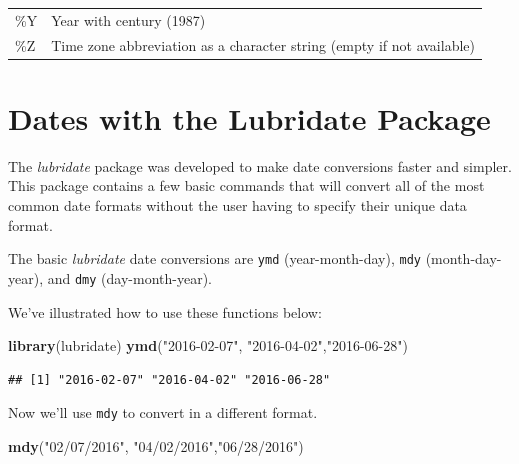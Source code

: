 \documentclass[]{book}
\newenvironment{Shaded}{\begin{snugshade}}{\end{snugshade}}
\newcommand{\KeywordTok}[1]{\textcolor[rgb]{0.13,0.29,0.53}{\textbf{{#1}}}}
\newcommand{\StringTok}[1]{\textcolor[rgb]{0.31,0.60,0.02}{{#1}}}
\newcommand{\NormalTok}[1]{{#1}}
\begin{document}
\begin{longtable}[]{@{}ll@{}}
\begin{minipage}[t]{0.34\columnwidth}\raggedright\strut
\%Y\strut
\end{minipage} & \begin{minipage}[t]{0.48\columnwidth}\raggedright\strut
Year with century (1987)\strut
\end{minipage}\tabularnewline
\begin{minipage}[t]{0.34\columnwidth}\raggedright\strut
\%Z\strut
\end{minipage} & \begin{minipage}[t]{0.48\columnwidth}\raggedright\strut
Time zone abbreviation as a character string (empty if not
available)\strut
\end{minipage}\tabularnewline
\bottomrule
\end{longtable}

\section{Dates with the Lubridate
Package}\label{dates-with-the-lubridate-package}

The \emph{lubridate} package was developed to make date conversions
faster and simpler. This package contains a few basic commands that will
convert all of the most common date formats without the user having to
specify their unique data format.

The basic \emph{lubridate} date conversions are \texttt{ymd}
(year-month-day), \texttt{mdy} (month-day-year), and \texttt{dmy}
(day-month-year).

We've illustrated how to use these functions below:

\begin{Shaded}
\begin{Highlighting}[]
\KeywordTok{library}\NormalTok{(lubridate)}
\KeywordTok{ymd}\NormalTok{(}\StringTok{"2016-02-07"}\NormalTok{, }\StringTok{"2016-04-02"}\NormalTok{,}\StringTok{"2016-06-28"}\NormalTok{)}
\end{Highlighting}
\end{Shaded}

\begin{verbatim}
## [1] "2016-02-07" "2016-04-02" "2016-06-28"
\end{verbatim}

Now we'll use \texttt{mdy} to convert in a different format.

\begin{Shaded}
\begin{Highlighting}[]
\KeywordTok{mdy}\NormalTok{(}\StringTok{"02/07/2016"}\NormalTok{, }\StringTok{"04/02/2016"}\NormalTok{,}\StringTok{"06/28/2016"}\NormalTok{)}
\end{Highlighting}
\end{Shaded}
\end{document}
